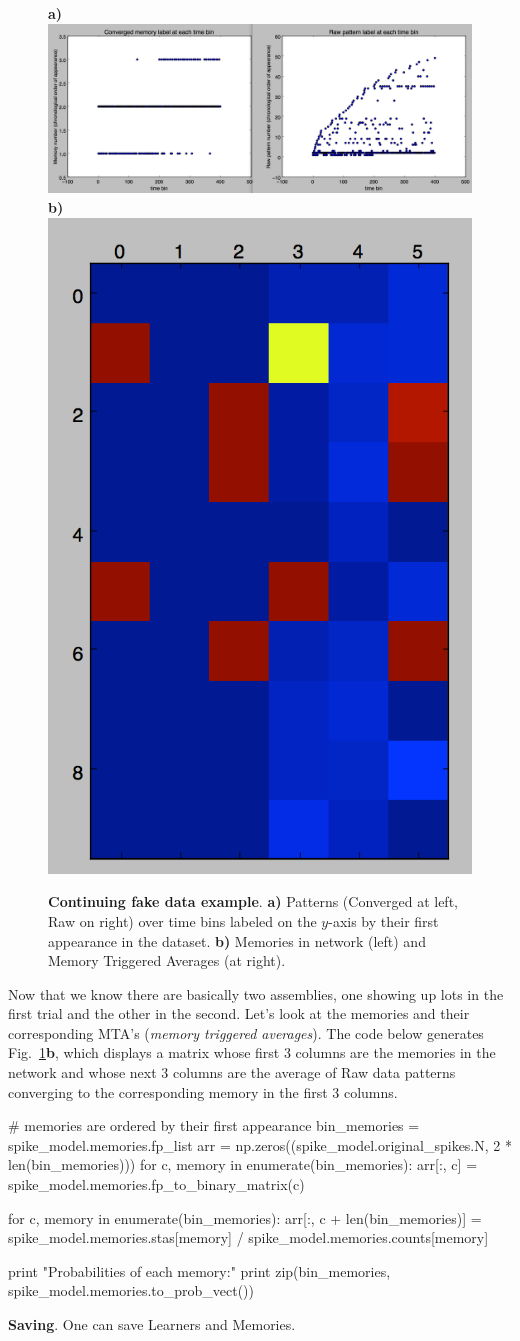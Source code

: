 \documentclass[letter, 12pt]{article}
\theoremstyle{definition}
\theoremstyle{remark}
\begin{document}
\begin{figure}[t!]
\begin{center}
\textbf{a)}\includegraphics[width=.75\linewidth]{chron_order_patterns.png} 
\textbf{b)}\includegraphics[width=.19\linewidth]{memories_stas.png} 
\caption{\textbf{Continuing fake data example}. \textbf{a)} Patterns (Converged at left, Raw on right) over time bins labeled on the $y$-axis by their first appearance in the dataset.  \textbf{b)}  Memories in network (left) and Memory Triggered Averages (at right).}
\label{fake_ex_fig2}
\vspace{-.8cm}
\end{center}
\end{figure}

Now that we know there are basically two assemblies, one showing up lots in the first trial and the other in the second.  Let's look at the
memories and their corresponding MTA's (\textit{memory triggered averages}).  The code below generates Fig.~\ref{fake_ex_fig2}\textbf{b}, which displays
a matrix whose first 3 columns are the memories in the network and whose next 3 columns are the average of Raw data patterns converging to the corresponding memory in the first 3 columns.

\begin{python}
# memories are ordered by their first appearance
bin_memories = spike_model.memories.fp_list
arr = np.zeros((spike_model.original_spikes.N, 2 * len(bin_memories)))
for c, memory in enumerate(bin_memories):
	arr[:, c] = spike_model.memories.fp_to_binary_matrix(c)

for c, memory in enumerate(bin_memories):
	arr[:, c + len(bin_memories)] = spike_model.memories.stas[memory] /
			spike_model.memories.counts[memory]

print "Probabilities of each memory:"
print zip(bin_memories, spike_model.memories.to_prob_vect())
\end{python}

\textbf{Saving}.  One can save Learners and Memories.

\scriptsize
\setlength{\bibsep}{0pt plus 0.3ex}

 
\end{document}
